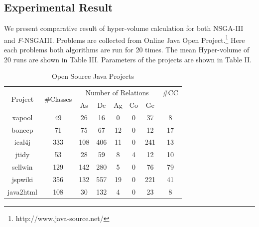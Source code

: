 \documentclass[letterpaper, 10 pt, conference]{ieeeconf}  %
\begin{document}
\subsection{Experimental Result}
We present comparative result of hyper-volume calculation for both NSGA-III and \textit{F}-NSGAIII. Problems are collected from Online Java Open Project.\footnote{http://www.java-source.net/}
Here each problems both algorithms are run for 20 times.
The mean Hyper-volume of 20 runs are shown in Table III.
Parameters of the projects are shown in Table II.
\begin{table}[!h]


\begin{center}
\caption{Open Source Java Projects}

\begin{tabular}{ |c|c|c|c|c|c|c|c| } 

\hline \multirow{2}{*}{Project } &	\multirow{2}{*}{\#Classes}&	\multicolumn{5}{|c|}{Number of Relations} & \#CC\\
& & As & De & Ag & Co & Ge  \\ \hline

xapool & 49 & 26 & 16 & 0 & 0 & 37 & 8 \\
\hline

bonecp & 71 & 75 & 67 & 12 & 0 & 12 & 17 \\
\hline

ical4j & 333 & 108 & 406 & 11 & 0 & 241 & 13 \\
\hline

jtidy & 53 & 28 & 59 & 8 & 4 & 12 & 10 \\
\hline


sellwin & 129 & 142 & 280 & 5 & 0 & 76 & 79 \\
\hline

jspwiki & 356 & 132 & 557 & 19 & 0 & 221 & 41 \\ \hline 

java2html & 108 & 30 & 132 & 4 & 0 & 23 & 8 \\
\hline

\end{tabular}

\end{center}
\end{table}
\end{document}
